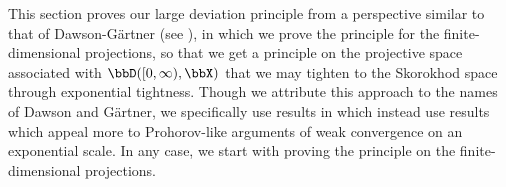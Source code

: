 This section proves our large deviation principle from a perspective similar to that of Dawson-G\"artner (see \cite[]{dembo2010}), in which we prove the principle for the finite-dimensional projections, so that we get a principle on the projective space associated with $\pathSpace{[0,\infty)}{\stateSpace}$ that we may tighten to the Skorokhod space through exponential tightness.
Though we attribute this approach to the names of Dawson and G\"artner, we specifically use results in \cite{feng2006} which instead use results which appeal more to Prohorov-like arguments of weak convergence on an exponential scale.
In any case, we start with proving the principle on the finite-dimensional projections.
